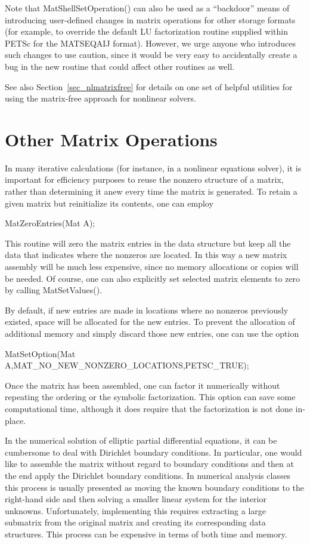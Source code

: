 Note that MatShellSetOperation() can also be used as a
``backdoor'' means of introducing user-defined changes in matrix
operations for other storage formats (for example, to override the
default LU factorization routine supplied within PETSc for the
MATSEQAIJ format).  However, we urge anyone who introduces such
changes to use caution, since it would be very easy to
accidentally create a bug in the new routine that could affect
other routines as well.

See also Section~\ref{sec_nlmatrixfree} for details on one set of
helpful utilities for using the matrix-free approach for nonlinear
solvers.

\section{Other Matrix Operations}
\label{sec_othermat}

In many iterative calculations (for instance, in a nonlinear equations
solver), it is important for efficiency purposes to reuse the nonzero 
structure of a matrix, rather than determining it anew every time 
the matrix is generated.  To retain a given matrix but reinitialize
its contents, one can employ
\begin{tabbing}
  MatZeroEntries(Mat A);
\end{tabbing}
This routine will zero the matrix entries in the 
data structure but keep all the data that indicates where the nonzeros
are located.  In this way a new matrix assembly will be much less 
expensive, since no memory allocations or copies will be needed. 
Of course, one can also explicitly set selected matrix elements to zero
by calling MatSetValues().

By default, if new entries are made in locations where no nonzeros 
previously existed, space will be allocated for the new entries. 
To prevent the allocation of additional memory and simply discard those 
new entries, one can use the option
\begin{tabbing}
  MatSetOption(Mat A,MAT\_NO\_NEW\_NONZERO\_LOCATIONS,PETSC_TRUE);
\end{tabbing}
Once the matrix has been assembled, one can factor it numerically
without repeating the ordering or the symbolic factorization. 
This option can save some computational time, although it
does require that the factorization is not done in-place.

In the numerical solution of elliptic partial differential equations,
it can be cumbersome to deal with Dirichlet boundary 
 conditions. In
particular, one would like to assemble the matrix without regard to 
boundary conditions and then at the end apply the Dirichlet boundary 
conditions. 
In numerical analysis classes this process is usually presented as moving the 
known boundary conditions to the right-hand side and then solving a smaller
linear system for the interior unknowns. Unfortunately, implementing this
requires extracting a large submatrix from the original matrix and 
creating its corresponding data structures. This process can be expensive 
in terms of both time and memory. 

